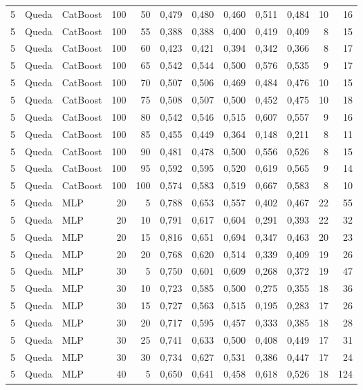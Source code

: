 \begin{longtable}{@{}rllrrrrrrrrr@{}}
5 & Queda & CatBoost & 100 & 50 & 0,479 & 0,480 & 0,460 & 0,511 & 0,484 & 10 & 16 \\
5 & Queda & CatBoost & 100 & 55 & 0,388 & 0,388 & 0,400 & 0,419 & 0,409 & 8 & 15 \\
5 & Queda & CatBoost & 100 & 60 & 0,423 & 0,421 & 0,394 & 0,342 & 0,366 & 8 & 17 \\
5 & Queda & CatBoost & 100 & 65 & 0,542 & 0,544 & 0,500 & 0,576 & 0,535 & 9 & 17 \\
5 & Queda & CatBoost & 100 & 70 & 0,507 & 0,506 & 0,469 & 0,484 & 0,476 & 10 & 15 \\
5 & Queda & CatBoost & 100 & 75 & 0,508 & 0,507 & 0,500 & 0,452 & 0,475 & 10 & 18 \\
5 & Queda & CatBoost & 100 & 80 & 0,542 & 0,546 & 0,515 & 0,607 & 0,557 & 9 & 16 \\
5 & Queda & CatBoost & 100 & 85 & 0,455 & 0,449 & 0,364 & 0,148 & 0,211 & 8 & 11 \\
5 & Queda & CatBoost & 100 & 90 & 0,481 & 0,478 & 0,500 & 0,556 & 0,526 & 8 & 15 \\
5 & Queda & CatBoost & 100 & 95 & 0,592 & 0,595 & 0,520 & 0,619 & 0,565 & 9 & 14 \\
5 & Queda & CatBoost & 100 & 100 & 0,574 & 0,583 & 0,519 & 0,667 & 0,583 & 8 & 10 \\
5 & Queda & MLP & 20 & 5 & 0,788 & 0,653 & 0,557 & 0,402 & 0,467 & 22 & 55 \\
5 & Queda & MLP & 20 & 10 & 0,791 & 0,617 & 0,604 & 0,291 & 0,393 & 22 & 32 \\
5 & Queda & MLP & 20 & 15 & 0,816 & 0,651 & 0,694 & 0,347 & 0,463 & 20 & 23 \\
5 & Queda & MLP & 20 & 20 & 0,768 & 0,620 & 0,514 & 0,339 & 0,409 & 19 & 26 \\
5 & Queda & MLP & 30 & 5 & 0,750 & 0,601 & 0,609 & 0,268 & 0,372 & 19 & 47 \\
5 & Queda & MLP & 30 & 10 & 0,723 & 0,585 & 0,500 & 0,275 & 0,355 & 18 & 36 \\
5 & Queda & MLP & 30 & 15 & 0,727 & 0,563 & 0,515 & 0,195 & 0,283 & 17 & 26 \\
5 & Queda & MLP & 30 & 20 & 0,717 & 0,595 & 0,457 & 0,333 & 0,385 & 18 & 28 \\
5 & Queda & MLP & 30 & 25 & 0,741 & 0,633 & 0,500 & 0,408 & 0,449 & 17 & 31 \\
5 & Queda & MLP & 30 & 30 & 0,734 & 0,627 & 0,531 & 0,386 & 0,447 & 17 & 24 \\
5 & Queda & MLP & 40 & 5 & 0,650 & 0,641 & 0,458 & 0,618 & 0,526 & 18 & 124 \\

\end{longtable}
